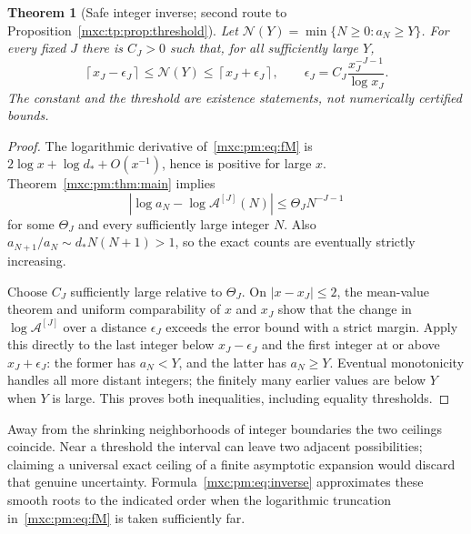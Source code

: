 \documentclass[11pt]{article}
\numberwithin{equation}{section}
\newtheorem{theorem}{Theorem}[section]
\theoremstyle{definition}
\theoremstyle{remark}
\begin{document}
\begin{theorem}[Safe integer inverse; second route to Proposition~\ref{mxc:tp:prop:threshold}]\label{mxc:pm:thm:ceiling}
Let $\mathcal N(Y)=\min\{N\ge0:a_N\ge Y\}$. For every fixed $J$ there is
$C_J>0$ such that, for all sufficiently large $Y$,
\begin{equation}\label{mxc:pm:eq:ceilings}
 \left\lceil x_J-\epsilon_J\right\rceil\le \mathcal N(Y)
      \le\left\lceil x_J+\epsilon_J\right\rceil,
 \qquad \epsilon_J=C_J\frac{x_J^{-J-1}}{\log x_J}.
\end{equation}
The constant and the threshold are existence statements, not numerically
certified bounds.
\end{theorem}
\begin{proof}
The logarithmic derivative of~\eqref{mxc:pm:eq:fM} is
$2\log x+\log d_*+O(x^{-1})$, hence is positive for large $x$.
Theorem~\ref{mxc:pm:thm:main} implies
\[
 |\log a_N-\log\mathcal A^{[J]}(N)|\le\Theta_J N^{-J-1}
\]
for some $\Theta_J$ and every sufficiently large integer $N$. Also
$a_{N+1}/a_N\sim d_*N(N+1)>1$, so the exact counts are eventually strictly
increasing.

Choose $C_J$ sufficiently large relative to $\Theta_J$. On $|x-x_J|\le2$, the
mean-value theorem and uniform comparability of $x$ and $x_J$ show that the
change in $\log\mathcal A^{[J]}$ over a distance $\epsilon_J$ exceeds the error
bound with a strict margin. Apply this directly to the last integer below
$x_J-\epsilon_J$ and the first integer at or above $x_J+\epsilon_J$: the former
has $a_N<Y$, and the latter has $a_N\ge Y$. Eventual monotonicity handles all
more distant integers; the finitely many earlier values are below $Y$ when
$Y$ is large. This proves both inequalities, including equality thresholds.
\end{proof}
Away from the shrinking neighborhoods of integer boundaries the two ceilings
coincide. Near a threshold the interval can leave two adjacent
possibilities; claiming a universal exact ceiling of a finite asymptotic
expansion would discard that genuine uncertainty.
Formula~\eqref{mxc:pm:eq:inverse} approximates these smooth roots to the
indicated order when the logarithmic truncation in~\eqref{mxc:pm:eq:fM} is
taken sufficiently far.
\end{document}

